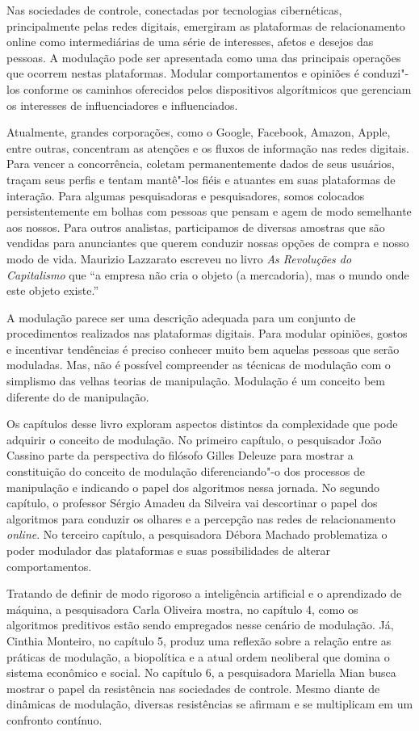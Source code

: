 Nas sociedades de controle, conectadas por tecnologias cibernéticas,
principalmente pelas redes digitais, emergiram as plataformas de
relacionamento online como intermediárias de uma série de interesses,
afetos e desejos das pessoas. A modulação pode ser apresentada como uma
das principais operações que ocorrem nestas plataformas. Modular
comportamentos e opiniões é conduzi"-los conforme os caminhos oferecidos
pelos dispositivos algorítmicos que gerenciam os interesses de
influenciadores e influenciados.

Atualmente, grandes corporações, como o Google, Facebook, Amazon,
Apple, entre outras, concentram as atenções e os fluxos de informação
nas redes digitais. Para vencer a concorrência, coletam permanentemente
dados de seus usuários, traçam seus perfis e tentam mantê"-los fiéis e
atuantes em suas plataformas de interação. Para algumas pesquisadoras e pesquisadores,
somos colocados persistentemente em bolhas com pessoas que
pensam e agem de modo semelhante aos nossos. Para outros analistas, participamos de
diversas amostras que são vendidas para anunciantes que querem conduzir
nossas opções de compra e nosso modo de vida. Maurizio Lazzarato
escreveu no livro \emph{As Revoluções do Capitalismo} que ``a
empresa não cria o objeto (a mercadoria), mas o mundo onde este objeto existe.''

A modulação parece ser uma descrição adequada para um conjunto de
procedimentos realizados nas plataformas digitais. Para modular
opiniões, gostos e incentivar tendências é preciso conhecer muito bem
aquelas pessoas que serão moduladas. Mas, não é possível compreender as
técnicas de modulação com o simplismo das velhas teorias de manipulação.
Modulação é um conceito bem diferente do de manipulação.

Os capítulos desse livro exploram aspectos distintos da complexidade que
pode adquirir o conceito de modulação. No primeiro capítulo, o
pesquisador João Cassino parte da perspectiva do filósofo Gilles Deleuze
para mostrar a constituição do conceito de modulação diferenciando"-o dos
processos de manipulação e indicando o papel dos algoritmos nessa
jornada. No segundo capítulo, o professor Sérgio Amadeu da Silveira vai
descortinar o papel dos algoritmos para conduzir os olhares e a
percepção nas redes de relacionamento \emph{online}. No terceiro
capítulo, a pesquisadora Débora Machado problematiza o poder modulador
das plataformas e suas possibilidades de alterar comportamentos.

Tratando de definir de modo rigoroso a inteligência artificial e o
aprendizado de máquina, a pesquisadora Carla Oliveira mostra, no
capítulo 4, como os algoritmos preditivos estão sendo empregados nesse
cenário de modulação. Já, Cinthia Monteiro, no capítulo 5, produz uma
reflexão sobre a relação entre as práticas de modulação, a biopolítica e
a atual ordem neoliberal que domina o sistema econômico e social. No
capítulo 6, a pesquisadora Mariella Mian busca mostrar o papel da
resistência nas sociedades de controle. Mesmo diante de dinâmicas de
modulação, diversas resistências se afirmam e se multiplicam em um
confronto contínuo.

